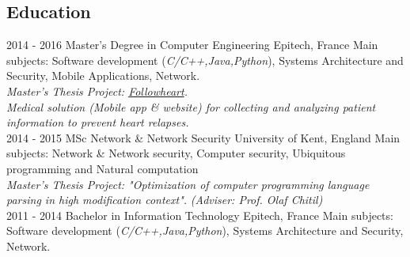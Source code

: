 \documentclass[8pt]{friggeri-cv}
\begin{document}
\begin{samepage}
\section{Education}
\begin{entrylist}
  \entry
    {2014 - 2016}
    {Master's Degree in Computer Engineering}
    {Epitech, France}
    {Main subjects: Software development (\textit{C/C++,Java,Python}), Systems Architecture and Security, Mobile Applications, Network.\\
    \emph{Master's Thesis Project: \href{http://followheart.fr}{Followheart}.}\\
    \emph{Medical solution (Mobile app \& website) for collecting and analyzing patient information to prevent heart relapses.}\\}
  \entry
    {2014 - 2015}
    {MSc Network \& Network Security}
    {University of Kent, England}
    {Main subjects: Network \& Network security, Computer security, Ubiquitous programming and Natural computation\\
    \emph{Master's Thesis Project: "Optimization of computer programming language parsing in high modification context".}
    \emph{(Adviser: Prof. Olaf Chitil)}\\}
     \entry
    {2011 - 2014}
    {Bachelor in Information Technology}
    {Epitech, France}
    {Main subjects: Software development (\textit{C/C++,Java,Python}), Systems Architecture and Security, Network.}
\end{entrylist}
\end{samepage}
\end{document}
